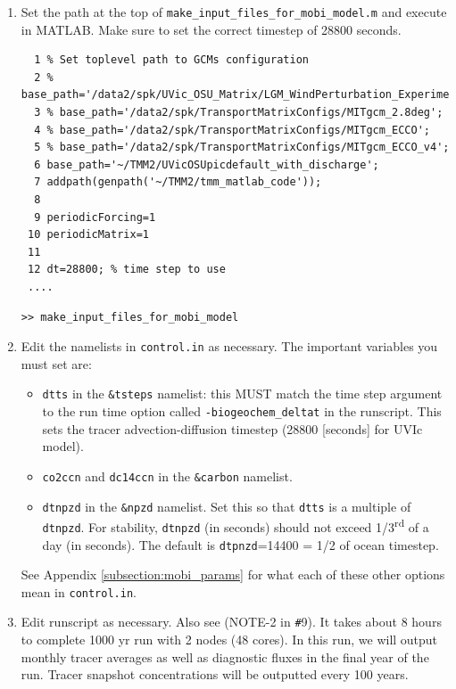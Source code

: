 \documentclass[a4paper]{article}
\def\noin{\noindent }
\begin{document}
\begin{enumerate}
\item Set the path at the top of \verb|make_input_files_for_mobi_model.m| and execute in MATLAB. Make sure to set the correct timestep of 28800 seconds. 
\lstset{language=matlab} 
\begin{lstlisting}[frame=single,basicstyle=\scriptsize,commentstyle=\color{blue}]
 % make_input_files_for_mobi_model.m
  1 % Set toplevel path to GCMs configuration
  2 % base_path='/data2/spk/UVic_OSU_Matrix/LGM_WindPerturbation_Experiments/no_embm_awind2/picdefault';
  3 % base_path='/data2/spk/TransportMatrixConfigs/MITgcm_2.8deg';
  4 % base_path='/data2/spk/TransportMatrixConfigs/MITgcm_ECCO';
  5 % base_path='/data2/spk/TransportMatrixConfigs/MITgcm_ECCO_v4';
  6 base_path='~/TMM2/UVicOSUpicdefault_with_discharge';
  7 addpath(genpath('~/TMM2/tmm_matlab_code'));
  8
  9 periodicForcing=1
 10 periodicMatrix=1
 11
 12 dt=28800; % time step to use
 ....
\end{lstlisting}
\begin{lstlisting}[style=DOS]
 >> make_input_files_for_mobi_model
\end{lstlisting}

\item Edit the namelists in \verb|control.in| as necessary. The important variables you 
must set are:

\begin{itemize}
\item \verb|dtts| in the \verb|&tsteps| namelist: this MUST match the time step argument to the run time option called \verb|-biogeochem_deltat| in the runscript. This sets the tracer advection-diffusion timestep (28800 [seconds] for UVIc model). 
\item \verb|co2ccn| and \verb|dc14ccn| in the \verb|&carbon| namelist. 
\item \verb|dtnpzd| in the \verb|&npzd| namelist. Set this so that \verb|dtts| is a multiple of \verb|dtnpzd|. For stability, \verb|dtnpzd| (in seconds) should not exceed 1/3\textsuperscript{rd} of a day (in seconds). The default is \verb|dtpnzd|=14400 = 1/2 of ocean timestep. 
\end{itemize}
\noin See Appendix \ref{subsection:mobi_params} for what each of these other options mean in \verb|control.in|. 

\item Edit runscript as necessary. Also see (NOTE-2 in \verb|#|9). It takes about 8 hours to complete 1000 yr run with 2 nodes (48 cores). In this run, we will output monthly tracer averages as well as diagnostic fluxes in the final year of the run. Tracer snapshot concentrations will be outputted every 100 years.


\end{enumerate}
\end{document}
